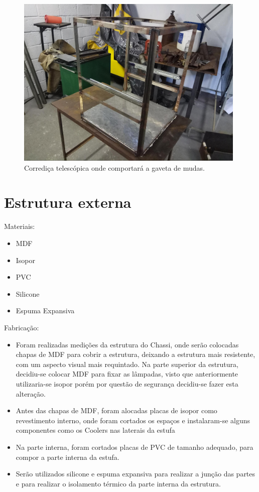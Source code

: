 \begin{figure}[H]
	\centering
	\includegraphics[width=11cm]{figuras/resultado_2.jpg}
	\caption{Corrediça telescópica onde comportará a gaveta de mudas.} \label{resultado_2}
\end{figure}

\section{Estrutura externa}

Materiais:
\begin{itemize}
	\item MDF
	\item Isopor
	\item PVC
	\item Silicone
	\item Espuma Expansiva
\end{itemize}

Fabricação:
\begin{itemize}
	\item	Foram realizadas medições da estrutura do Chassi, onde serão colocadas chapas de MDF para cobrir a estrutura, deixando a estrutura mais resistente, com um aspecto visual mais requintado. Na parte superior da estrutura, decidiu-se colocar MDF para fixar as lâmpadas, visto que anteriormente utilizaria-se isopor porém por questão de segurança decidiu-se fazer esta alteração.
	\item	Antes das chapas de MDF, foram alocadas placas de isopor como revestimento interno, onde foram cortados os espaços e instalaram-se alguns componentes como os Coolers nas laterais da estufa
	\item	Na parte interna, foram cortados placas de PVC de tamanho adequado, para compor a parte interna da estufa.
	\item	Serão utilizados silicone e espuma expansiva para realizar a junção das partes e para realizar o isolamento térmico da parte interna da estrutura.
\end{itemize}

